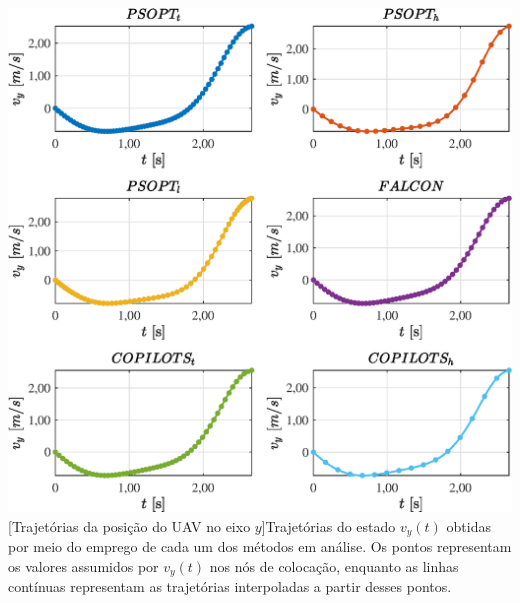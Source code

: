 \noindent
\begin{minipage}{\textwidth}
	\vspace{\onelineskip}
	\centering
	\includegraphics[scale=0.7]{fig/resultados/uav/traj/x/v_y}
	[Trajetórias da posição do UAV no eixo $y$]{Trajetórias do estado $ v_y(t) $ obtidas por meio do emprego de cada um dos métodos em análise. Os pontos representam os valores assumidos por $ v_y(t) $ nos nós de colocação, enquanto as linhas contínuas representam as trajetórias interpoladas a partir desses pontos.}
	\label{fig:uav:x:v_y}
	\vspace{\onelineskip}
\end{minipage}

